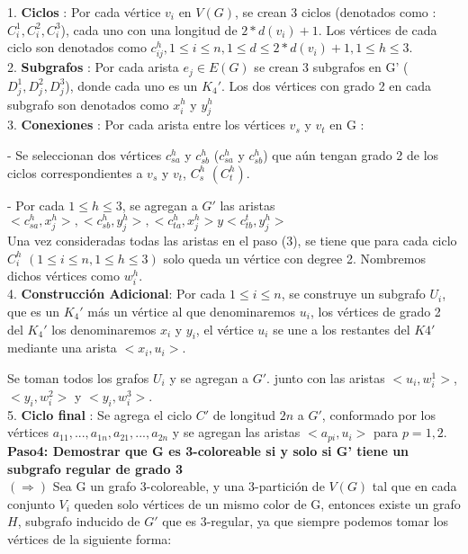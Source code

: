 \documentclass[
10pt, %
a4paper, %
oneside, %
headinclude,footinclude, %
BCOR5mm, %
]{scrartcl}
\begin{document}
1. \textbf{Ciclos} : Por cada vértice $v_i$ en $V(G)$, se crean 3 ciclos (denotados como : $C^1_i, C^2_i, C^3_i$), 
cada uno con una longitud de $2*d(v_i) + 1$. Los vértices de cada ciclo son denotados como $c_{ij}^{h} , 1 \leq i \leq n , 1 \leq d \leq 2*d(v_i) + 1 , 1 \leq h \leq 3 $.\\

2. \textbf{Subgrafos} : Por cada arista $e_j \in E(G)$ se crean 3 subgrafos en G' ($D^1_j, D^2_j, D^3_j$), donde cada uno es un $K_4'$. Los dos vértices con grado 2 en cada 
subgrafo son denotados como $x^h_i$ y $y^h_j$\\

3. \textbf{Conexiones} : Por cada arista entre los vértices $v_s$ y $v_t$ en G :

- Se seleccionan dos vértices $c_{sa}^{h}$ y $c_{sb}^{h}$ ($c_{sa}^{h}$ y $c_{sb}^{h}$) que aún tengan grado 2 de los ciclos correspondientes a $v_s$ y $v_t$, $C^h_s$ $(C^h_t)$.

- Por cada $1\leq h \leq 3$, se agregan a $G'$ las aristas $<c_{sa}^{h},x^h_j> , <c_{sb}^{h},y^h_j> , <c_{ta}^{h},x^h_j>  y <c_{tb}^{t}, y^h_j >$\\

Una vez consideradas todas las aristas en
el paso (3), se tiene que para cada ciclo $C^h_i$ $( 1\leq i \leq n, 1 \leq h \leq 3 )$ solo queda un vértice con degree 2. Nombremos
dichos vértices como $w^h_i$.\\

4. \textbf{Construcción Adicional}: Por cada $1 \leq i \leq n$, se construye un subgrafo $U_i$, que es un $K_4'$ más un vértice al que denominaremos $u_i$, los vértices de grado 2 del $K_4'$ los denominaremos 
$x_i$ y $y_i$, el vértice $u_i$ se une a los restantes del $K4'$ mediante una arista $<x_i, u_i>$. 

Se toman todos los grafos $U_i$ y se agregan a $G'$. junto con las aristas $<u_i,w^1_i>$, $<y_i, w^2_i>$ y $<y_i, w^3_i>$.\\


5. \textbf{Ciclo final} : Se agrega el ciclo $C'$ de longitud $2n$ a $G'$, conformado por los vértices ${a_{11},..., a_{1n}, a_{21},..., a_{2n}}$ y se agregan las aristas $<a_{pi}, u_i>$ para $p = 1,2$.\\


\textbf{Paso4: Demostrar que G es 3-coloreable si y solo si G' tiene un subgrafo regular de grado 3  }\\

$(\Rightarrow)$ Sea G un grafo 3-coloreable, y una 3-partición de $V(G)$ tal que en cada conjunto $V_i$ queden solo vértices de un mismo color de G, entonces existe un grafo $H$, 
subgrafo inducido de $G'$ que es 3-regular, ya que siempre podemos tomar los vértices de la siguiente forma:\\
\end{document}
